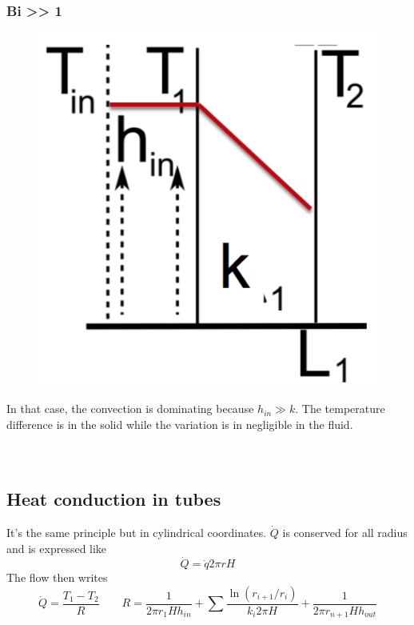  			 \subsubsection{Bi >> 1}
	 			\begin{figure}
 				\vspace{-5mm}
 				\includegraphics[scale=0.35]{ch3/9}
 				\end{figure}
 				In that case, the convection is dominating because $h_{in} \gg k$. The temperature difference is in the solid while the variation is in negligible in the fluid. \\\\\\
 			
	\subsection{Heat conduction in tubes}
	It's the same principle but in cylindrical coordinates. $\dot{Q}$ is conserved for all radius and is expressed like 
	\begin{equation}
		\dot{Q} = \dot{q}2\pi r H
		\label{eq:3.18}
	\end{equation}
 	The flow then writes 
 	\begin{equation}
 			\dot{Q} = \frac{T_1-T_2}{R}\qquad R = \frac{1}{2\pi r_1 H h_{in}} + \sum \frac{\ln (r_{i+1}/r_i)}{k_i 2\pi H} + \frac{1}{2 \pi r_{n+1}Hh_{out}}
 	\end{equation}
 	
